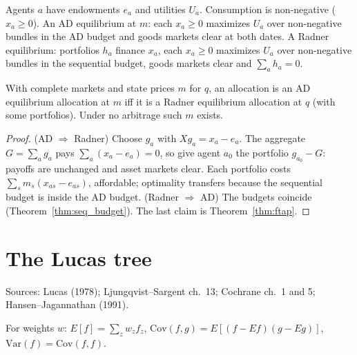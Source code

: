 \begin{definition}
\label{def:seq_equilibria}
\leanok
{}
Agents $a$ have endowments $e_a$ and utilities $U_a$. Consumption is non-negative ($x_a \ge 0$). An AD equilibrium at $m$: each $x_a \ge 0$ maximizes $U_a$ over
non-negative bundles in the AD budget and goods markets clear at both dates. A Radner equilibrium: portfolios $h_a$ finance $x_a$, each $x_a \ge 0$
maximizes $U_a$ over non-negative bundles in the sequential budget, goods markets clear and $\sum_ah_a = 0$.
\end{definition}

\begin{theorem}
\label{thm:seq_equilibria}
\leanok
{}
With complete markets and state prices $m$ for $q$, an allocation is an AD equilibrium allocation at $m$ iff it is a
Radner equilibrium allocation at $q$ (with some portfolios). Under no arbitrage such $m$ exists.
\end{theorem}
\begin{proof}
\leanok
(AD $\Rightarrow$ Radner) Choose $g_a$ with $Xg_a = x_a - e_a$. The aggregate $G = \sum_ag_a$ pays
$\sum_a(x_a - e_a) = 0$, so give agent $a_0$ the portfolio $g_{a_0} - G$: payoffs are unchanged and asset markets clear.
Each portfolio costs $\sum_sm_s(x_{as} - e_{as})$, affordable; optimality transfers because the sequential budget is
inside the AD budget. (Radner $\Rightarrow$ AD) The budgets coincide (Theorem~\ref{thm:seq_budget}). The last claim
is Theorem~\ref{thm:ftap}.
\end{proof}

\section{The Lucas tree}
\label{sec:lucastree}

Sources: Lucas (1978); Ljungqvist--Sargent ch.~13; Cochrane ch.~1 and 5; Hansen--Jagannathan (1991).

\begin{definition}
\label{def:lt_moments}
\leanok
For weights $w$: $E[f] = \sum_zw_zf_z$, $\mathrm{Cov}(f,g) = E[(f - Ef)(g - Eg)]$, $\mathrm{Var}(f) = \mathrm{Cov}(f,f)$.
\end{definition}

